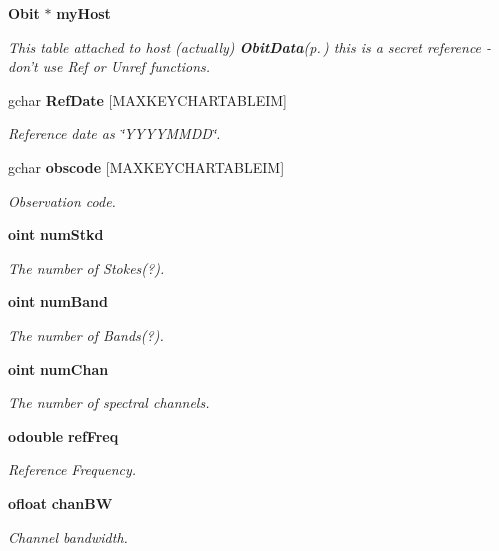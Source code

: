 \begin{CompactItemize}
{\bf Obit} $\ast$ {\bf my\-Host}
\begin{CompactList}\small\item\em This table attached to host (actually) {\bf Obit\-Data}{\rm (p.\,\pageref{structObitData})} this is a secret reference - don't use Ref or Unref functions. \item\end{CompactList}\item 
gchar {\bf Ref\-Date} [MAXKEYCHARTABLEIM]
\begin{CompactList}\small\item\em Reference date as \char`\"{}YYYYMMDD\char`\"{}. \item\end{CompactList}\item 
gchar {\bf obscode} [MAXKEYCHARTABLEIM]
\begin{CompactList}\small\item\em Observation code. \item\end{CompactList}\item 
{\bf oint} {\bf num\-Stkd}
\begin{CompactList}\small\item\em The number of Stokes(?). \item\end{CompactList}\item 
{\bf oint} {\bf num\-Band}
\begin{CompactList}\small\item\em The number of Bands(?). \item\end{CompactList}\item 
{\bf oint} {\bf num\-Chan}
\begin{CompactList}\small\item\em The number of spectral channels. \item\end{CompactList}\item 
{\bf odouble} {\bf ref\-Freq}
\begin{CompactList}\small\item\em Reference Frequency. \item\end{CompactList}\item 
{\bf ofloat} {\bf chan\-BW}
\begin{CompactList}\small\item\em Channel bandwidth. \item\end{CompactList}\item 

\end{CompactItemize}

